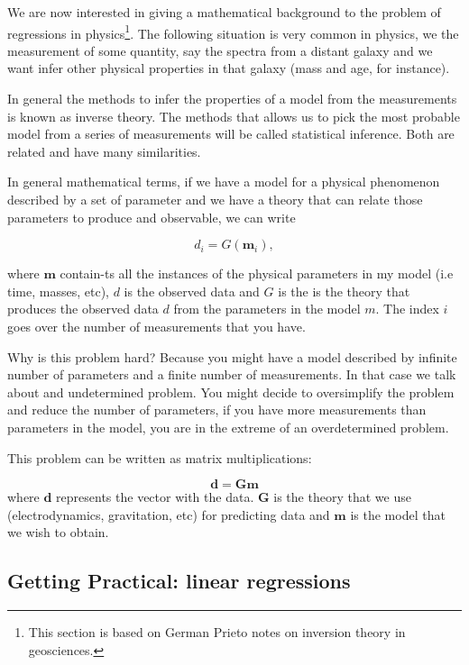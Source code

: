 \documentclass{article}
\begin{document}
We are now interested in giving a mathematical background to the problem of regressions in physics\footnote{This section is based on German Prieto notes on inversion theory in geosciences.}. 
The following situation is very common in physics, we the measurement of some quantity, say the spectra from a distant galaxy and we want infer other physical properties in that galaxy (mass and age, for instance).

In general the methods to infer the properties of a model from the measurements is known as inverse theory. The methods that allows us to pick the most probable model from a series of measurements will be called statistical inference. Both are related and have many similarities.

In general mathematical terms, if we have a model for a physical phenomenon described by a set of parameter and we have a theory that can relate those parameters to produce and observable, we can write

\begin{equation}
d_{i} = G (\mathbf{m}_{i}),
\end{equation}

where ${\mathbf m}$ contain-ts all the instances of the physical parameters in my model (i.e time, masses, etc), $d$ is the observed data and $G$ is the is the theory that produces the observed data $d$ from the parameters in the model $m$. The index $i$ goes over the number of measurements that you have.

Why is this problem hard? Because you might have a model described by infinite number of parameters and a finite number of measurements. In that case we talk about and undetermined problem. You might decide to oversimplify the problem and reduce the number of parameters, if you have more measurements than parameters in the model, you are in the extreme of an overdetermined problem.

This problem can be written as matrix multiplications:


\begin{equation}
\mathbf{d} = \mathbf{G}\mathbf{m}
\end{equation}
where $\mathbf{d}$ represents the vector with the data. $\mathbf{G}$ is the theory that we use (electrodynamics, gravitation, etc) for predicting data and $\mathbf{m}$ is the model that we wish to obtain.


\subsection{Getting Practical: linear regressions}
\end{document}
